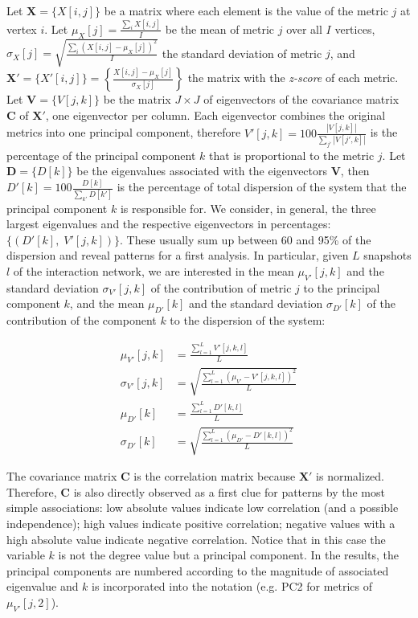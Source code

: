 Let $\mathbf{X}=\{X[i,j]\}$ be a matrix where each element is the value
of the metric $j$ at vertex $i$.
Let
$\mu_X [j]=\frac{\sum_i X[i,j]}{I}$ be the mean of metric $j$ over all $I$ vertices, 
$\sigma_X [j]=\sqrt{\frac{\sum_i (X[i,j]-\mu_X [j])^2}{I}}$ the standard deviation of metric $j$,
and $\mathbf{X'}=\{X'[i,j]\}=\left\{\frac{X[i,j]-\mu_X[j]}{\sigma_X[j]}\right\}$ 
the matrix with the \emph{z-score} of each metric. 
Let $\mathbf{V}=\{V[j,k]\}$ be the matrix $J\times J$ of eigenvectors
of the covariance matrix $\mathbf{C}$
of $\mathbf{X'}$, one eigenvector per column.
Each eigenvector combines the original metrics into one principal component, therefore
$V'[j,k]=100\frac{|V[j,k]|}{\sum_{j'} |V[j',k]|}$
is the percentage of the principal component $k$
that is proportional to the metric $j$.
Let $\mathbf{D}=\{D[k]\}$ be the eigenvalues associated with the eigenvectors $\mathbf{V}$,
then $D'[k]=100\frac{D[k]}{\sum_{k'}D[k']}$
is the percentage of total dispersion of the system that the principal component $k$
is responsible for.
We consider, in general, the three largest eigenvalues and
the respective eigenvectors in percentages:
$\{(D'[k],\;V'[j,k])\}$.
These usually sum up between 60 and 95\% of the dispersion
and reveal patterns for a first analysis.
In particular, 
given $L$ snapshots $l$ of the interaction network,
we are interested in the mean
$\mu_{V'}[j,k]$
and the standard deviation $\sigma_{V'}[j,k]$ 
of the contribution of metric $j$ to the principal component $k$,
and the mean
$\mu_{D'}[k]$
and the standard deviation 
$\sigma_{D'}[k]$
of the contribution of the component $k$ to the dispersion
of the system:

\begin{align}\label{eq:pca}
\mu_{V'}[j,k]   &=\frac{\sum_{l=1}^L V'[j,k,l]}{L}\nonumber\\
\sigma_{V'}[j,k]&=\sqrt{\frac{\sum_{l=1}^L (\mu_{V'}-V'[j,k,l])^2}{L}}\\\nonumber
\mu_{D'}[k]&=\frac{\sum_{l=1}^L D'[k,l]}{L}\\\nonumber
\sigma_{D'}[k]&=\sqrt{\frac{\sum_{l=1}^L (\mu_{D'}-D'[k,l])^2}{L}}
\end{align}

The covariance matrix 
$\mathbf{C}$ is the correlation matrix because $\mathbf{X'}$ is normalized.
Therefore, $\mathbf{C}$ is also directly observed as a first clue for patterns
by the most simple associations:
low absolute values indicate low correlation (and a possible independence);
high values indicate positive correlation;
negative values with a high absolute value indicate negative correlation.
Notice that in this case the variable $k$ is not the degree value
but a principal component.
In the results, the principal components are numbered
according to the magnitude of associated eigenvalue and $k$ is incorporated into
the notation (e.g. PC2 for metrics of $\mu_{V'}[j,2]$).


